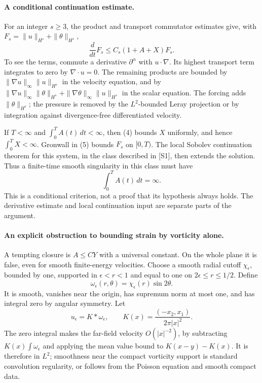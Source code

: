 \documentclass[11pt]{article}
\begin{document}
\paragraph{A conditional continuation estimate.}
For an integer $s\ge3$, the product and transport commutator estimates
give, with $F_s=\|u\|_{H^s}+\|\theta\|_{H^s}$,
\[
              \frac d{dt}F_s
                  \le C_s(1+A+X)F_s.                   \tag{5}
\]
To see the terms, commute a derivative $\partial^\alpha$ with
$u\cdot\nabla$. Its highest transport term integrates to zero by
$\nabla\cdot u=0$. The remaining products are bounded by
$\|\nabla u\|_\infty\|u\|_{H^s}$ in the velocity equation,
and by
$\|\nabla u\|_\infty\|\theta\|_{H^s}
 +\|\nabla\theta\|_\infty\|u\|_{H^s}$ in the scalar equation.
The forcing adds $\|\theta\|_{H^s}$; the pressure is removed by
the $L^2$-bounded Leray projection or by integration against
divergence-free differentiated velocity.

If $T<\infty$ and $\int_0^TA(t)\,dt<\infty$, then (4) bounds $X$
uniformly, and hence $\int_0^TX<\infty$. Gronwall in (5) bounds
$F_s$ on $[0,T)$. The local Sobolev continuation theorem for this
system, in the class described in [S1], then extends the solution.
Thus a finite-time smooth singularity in this class must have
\[
                              \int_0^TA(t)\,dt=\infty.   \tag{6}
\]
This is a conditional criterion, not a proof that its hypothesis
always holds. The derivative estimate and local continuation input
are separate parts of the argument.

\paragraph{An explicit obstruction to bounding strain by vorticity alone.}
A tempting closure is $A\le C Y$ with a universal constant. On the
whole plane it is false, even for smooth finite-energy velocities.
Choose a smooth radial cutoff $\chi_\epsilon$, bounded by one,
supported in $\epsilon<r<1$ and equal to one on
$2\epsilon\le r\le1/2$. Define
\[
                         \omega_\epsilon(r,\theta)
                                      =\chi_\epsilon(r)\sin2\theta.
\]
It is smooth, vanishes near the origin, has supremum norm at most one,
and has integral zero by angular symmetry. Let
\[
 u_\epsilon=K*\omega_\epsilon,\qquad
                   K(x)=\frac{(-x_2,x_1)}{2\pi|x|^2}.
\]
The zero integral makes the far-field velocity $O(|x|^{-2})$, by
subtracting $K(x)\int\omega_\epsilon$ and applying the mean value
bound to $K(x-y)-K(x)$. It is therefore in $L^2$; smoothness near
the compact vorticity support is standard convolution regularity,
or follows from the Poisson equation and smooth compact data.
\end{document}
